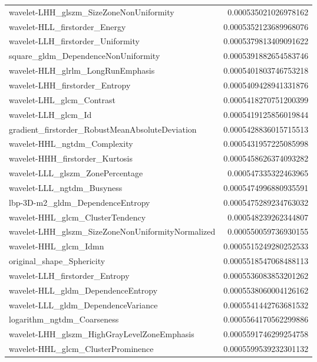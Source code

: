 {\begin{xltabular}[H]{\textwidth}{X r}
        wavelet-LHH\_glszm\_SizeZoneNonUniformity & 0.000535021026978162 \\
        wavelet-HLL\_firstorder\_Energy & 0.0005352123689968076 \\
        wavelet-LLH\_firstorder\_Uniformity & 0.0005379813409091622 \\
        square\_gldm\_DependenceNonUniformity & 0.0005391882654583746 \\
        wavelet-HLH\_glrlm\_LongRunEmphasis & 0.0005401803746753218 \\
        wavelet-LHH\_firstorder\_Entropy & 0.0005409428941331876 \\
        wavelet-LHL\_glcm\_Contrast & 0.0005418270751200399 \\
        wavelet-LLH\_glcm\_Id & 0.0005419125856019844 \\
        gradient\_firstorder\_RobustMeanAbsoluteDeviation & 0.0005428836015715513 \\
        wavelet-HHL\_ngtdm\_Complexity & 0.0005431957225085998 \\
        wavelet-HHH\_firstorder\_Kurtosis & 0.0005458626374093282 \\
        wavelet-LLL\_glszm\_ZonePercentage & 0.000547335322463965 \\
        wavelet-LLL\_ngtdm\_Busyness & 0.0005474996880935591 \\
        lbp-3D-m2\_gldm\_DependenceEntropy & 0.0005475289234763032 \\
        wavelet-HHL\_glcm\_ClusterTendency & 0.000548239262344807 \\
        wavelet-LHH\_glszm\_SizeZoneNonUniformityNormalized & 0.000550059736930155 \\
        wavelet-HHL\_glcm\_Idmn & 0.0005515249280252533 \\
        original\_shape\_Sphericity & 0.0005518547068488113 \\
        wavelet-LLH\_firstorder\_Entropy & 0.0005536083853201262 \\
        wavelet-HLL\_gldm\_DependenceEntropy & 0.0005538060004126162 \\
        wavelet-LLL\_gldm\_DependenceVariance & 0.0005541442763681532 \\
        logarithm\_ngtdm\_Coarseness & 0.0005564170562299886 \\
        wavelet-LHH\_glszm\_HighGrayLevelZoneEmphasis & 0.0005591746299254758 \\
        wavelet-HHL\_glcm\_ClusterProminence & 0.0005599539232301132 \\

\end{xltabular}}
